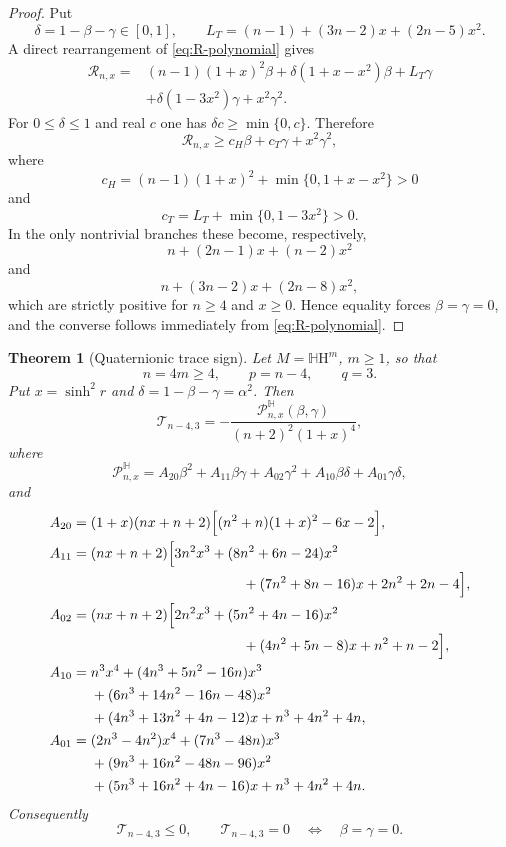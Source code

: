 \documentclass[11pt,reqno]{amsart}
\numberwithin{equation}{section}
\newtheorem{theorem}{Theorem}[section]
\theoremstyle{definition}
\theoremstyle{remark}
\newcommand{\HH}{\mathbb{H}\mathrm{H}}
\begin{document}
\begin{proof}
Put
\[
 \delta=1-\beta-\gamma\in[0,1],
 \qquad
 L_T=(n-1)+(3n-2)x+(2n-5)x^2.
\]
A direct rearrangement of \eqref{eq:R-polynomial} gives
\[
\begin{aligned}
\mathcal R_{n,x}
={}&(n-1)(1+x)^2\beta
 +\delta(1+x-x^2)\beta
 +L_T\gamma\\
&+\delta(1-3x^2)\gamma+x^2\gamma^2.
\end{aligned}
\]
For $0\le\delta\le1$ and real $c$ one has
$\delta c\ge\min\{0,c\}$.  Therefore
\[
 \mathcal R_{n,x}\ge c_H\beta+c_T\gamma+x^2\gamma^2,
\]
where
\[
 c_H=(n-1)(1+x)^2+\min\{0,1+x-x^2\}>0
\]
and
\[
 c_T=L_T+\min\{0,1-3x^2\}>0.
\]
In the only nontrivial branches these become, respectively,
\[
 n+(2n-1)x+(n-2)x^2
\]
and
\[
 n+(3n-2)x+(2n-8)x^2,
\]
which are strictly positive for $n\ge4$ and $x\ge0$.  Hence equality forces
$\beta=\gamma=0$, and the converse follows immediately from
\eqref{eq:R-polynomial}.
\end{proof}

\begin{theorem}[Quaternionic trace sign]
\label{thm:quaternionic-trace-sign}
Let $M=\HH^m$, $m\ge1$, so that
\[
n=4m\ge4,
\qquad
p=n-4,
\qquad
q=3.
\]
Put $x=\sinh^2r$ and $\delta=1-\beta-\gamma=\alpha^2$.  Then
\[
\mathscr T_{n-4,3}
=
-\frac{\mathcal P^{\mathbb H}_{n,x}(\beta,\gamma)}{(n+2)^2(1+x)^4},
\]
where
\begin{equation}
\mathcal P^{\mathbb H}_{n,x}
=
A_{20}\beta^2
+A_{11}\beta\gamma
+A_{02}\gamma^2
+A_{10}\beta\delta
+A_{01}\gamma\delta,
\label{eq:quaternionic-positive-decomposition}
\end{equation}
and
\begin{align}
A_{20}
={}&
(1+x)(nx+n+2)
\Bigl[(n^2+n)(1+x)^2-6x-2\Bigr],
\label{eq:quat-A20}
\\
A_{11}
={}&
(nx+n+2)
\Bigl[
3n^2x^3+(8n^2+6n-24)x^2
\nonumber\\
&\hspace{3.8cm}
+(7n^2+8n-16)x+2n^2+2n-4
\Bigr],
\label{eq:quat-A11}
\\
A_{02}
={}&
(nx+n+2)
\Bigl[
2n^2x^3+(5n^2+4n-16)x^2
\nonumber\\
&\hspace{3.8cm}
+(4n^2+5n-8)x+n^2+n-2
\Bigr],
\label{eq:quat-A02}
\\
A_{10}
={}&
n^3x^4
+(4n^3+5n^2-16n)x^3
\nonumber\\
&+(6n^3+14n^2-16n-48)x^2
\nonumber\\
&+(4n^3+13n^2+4n-12)x
+n^3+4n^2+4n,
\label{eq:quat-A10}
\\
A_{01}
={}&
(2n^3-4n^2)x^4
+(7n^3-48n)x^3
\nonumber\\
&+(9n^3+16n^2-48n-96)x^2
\nonumber\\
&+(5n^3+16n^2+4n-16)x
+n^3+4n^2+4n.
\label{eq:quat-A01}
\end{align}
Consequently
\[
\mathscr T_{n-4,3}\le0,
\qquad
\mathscr T_{n-4,3}=0
\quad\Longleftrightarrow\quad
\beta=\gamma=0.
\]
\end{theorem}
\end{document}
